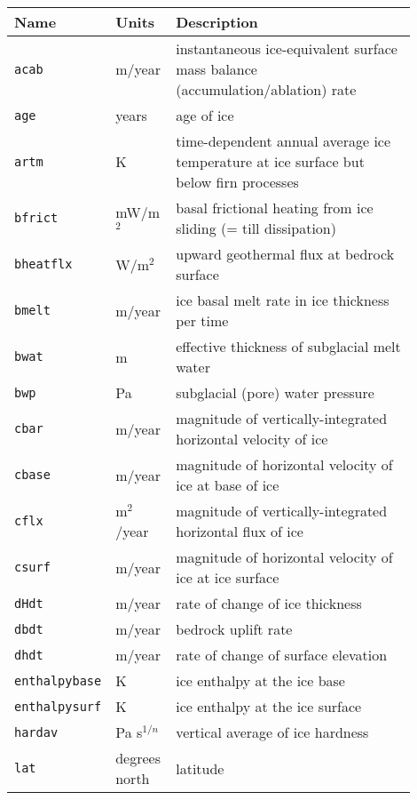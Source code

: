 \begin{table}[ht]
  \caption{Diagnostic quantities}
  \centering
\small \hspace{-2mm}
  \begin{longtable}{p{0.15\linewidth}p{0.15\linewidth}p{0.6\linewidth}}\hline
    \textbf{Name} & \textbf{Units} & \textbf{Description}\\
    \hline
    \texttt{acab} &m/year & instantaneous ice-equivalent surface mass balance (accumulation/ablation) rate \\
    \texttt{age} & years & age of ice \\
    \texttt{artm} & K & time-dependent annual average ice temperature at ice surface but below firn processes\\
    \texttt{bfrict} & mW/m$^{2}$ & basal frictional heating from ice sliding (= till dissipation) \\
    \texttt{bheatflx} & W/m$^{2}$ & upward geothermal flux at bedrock surface \\
    \texttt{bmelt} & m/year & ice basal melt rate in ice thickness per time \\
    \texttt{bwat} & m & effective thickness of subglacial melt water \\
    \texttt{bwp} & Pa & subglacial (pore) water pressure \\
    \texttt{cbar} & m/year & magnitude of vertically-integrated horizontal velocity of ice \\
    \texttt{cbase} & m/year & magnitude of horizontal velocity of ice at base of ice \\
    \texttt{cflx} & m$^{2}$/year & magnitude of vertically-integrated horizontal flux of ice \\
    \texttt{csurf} & m/year & magnitude of horizontal velocity of ice at ice surface \\
    \texttt{dHdt} & m/year & rate of change of ice thickness \\
    \texttt{dbdt} & m/year& bedrock uplift rate \\
    \texttt{dhdt} & m/year& rate of change of surface elevation \\
    \texttt{enthalpybase} & K & ice enthalpy at the ice base\\
    \texttt{enthalpysurf} & K & ice enthalpy at the ice surface\\
    \texttt{hardav} & Pa s$^{1/n}$ & vertical average of ice hardness \\
    \texttt{lat} & degrees north& latitude \\

\end{longtable}
\end{table}
